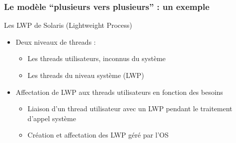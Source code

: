 \begin{frame}
 \frametitle{Le modèle ``plusieurs vers plusieurs'' : un exemple}
 \begin{exampleblock}{Les LWP de Solaris (Lightweight Process)}
 \begin{itemize}
 \item Deux niveaux de threads :
 \begin{itemize}
 \item Les threads utilisateurs, inconnus du système
 \item Les threads du niveau système (LWP)
 \end{itemize}
 \item Affectation de LWP aux threads utilisateurs en fonction des besoins
 \begin{itemize}
 \item Liaison d’un thread utilisateur avec un LWP pendant le traitement d’appel système
 \item Création et affectation des LWP géré par l’OS
 \end{itemize}
 \end{itemize}
 \end{exampleblock}
\end{frame}





